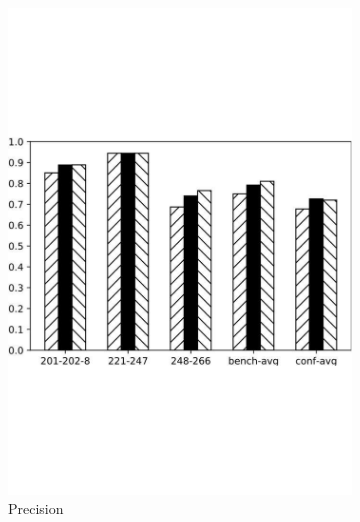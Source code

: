 \documentclass[twoside]{article}
\begin{document}
\begin{figure}[htb!]
\begin{subfigure}{0.3\textwidth}
\includegraphics[width=\textwidth]{data_figs/MulRegress_GMap_P.pdf}
\caption{Precision}
\label{fig:MultiRegress_GMap_P}
\end{subfigure}
\begin{subfigure}{0.3\textwidth}
	\centering

\end{subfigure}
\end{figure}
\end{document}
